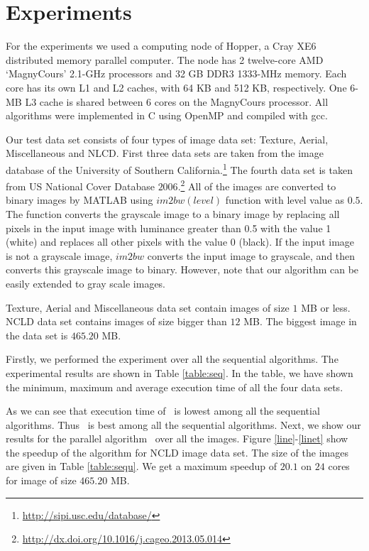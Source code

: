 \vspace{\sectionSpace}
\section{Experiments}
\label{sec:experiments}



For the experiments we used a computing node of Hopper, a Cray XE6 distributed memory parallel computer. 
The node has 2 twelve-core AMD ‘MagnyCours’ 2.1-GHz processors and 32 GB DDR3 1333-MHz memory. 
Each core has its own L1 and L2 caches, with 64 KB and 512 KB, respectively. 
One 6-MB L3 cache is shared between 6 cores on the MagnyCours processor. 
All algorithms were implemented in C using OpenMP and compiled with gcc.

Our test data set consists of four types of image data set: Texture, Aerial,
Miscellaneous and NLCD. First three data sets are taken from the image database of the University of 
Southern
California.\footnote{\url{http://sipi.usc.edu/database/}} 
The fourth data set is taken from US National Cover Database
$2006$.\footnote{\url{http://dx.doi.org/10.1016/j.cageo.2013.05.014}} All of the
images are converted to binary images by MATLAB using $im2bw(level)$ function with level value as $0.5$. The function 
converts the grayscale image to a binary image by replacing all pixels in the input image with luminance greater than 
0.5 with the value 1 (white) and replaces all other pixels with the value 0 (black). If the input image is not a grayscale image, 
$im2bw$ converts the input image to grayscale, and then converts this grayscale image to binary. However, note that our
algorithm can be easily extended to gray scale images.

Texture, Aerial and Miscellaneous data set contain images of size $1$ MB or less.
NCLD data set contains images of size bigger than $12$ MB. The biggest image in the data set is $465.20$ MB.

Firstly, we performed the experiment over all the sequential algorithms. The
experimental results are shown in Table \ref{table:seq}. In the table, we have
shown the minimum, maximum and average execution time of all the four data sets. 





As we can see that execution time of \aremsp\ is lowest among all
the sequential algorithms. Thus \aremsp\ is best among all the sequential
algorithms.
Next, we show our results for the parallel algorithm \paremsp\ over all the images.
Figure \ref{line}-\ref{linet} show the speedup of the algorithm for 
NCLD image data set. The size of the images are given in Table \ref{table:sequ}.
We get a maximum speedup of $20.1$ on $24$ cores for image of size $465.20$ MB.

